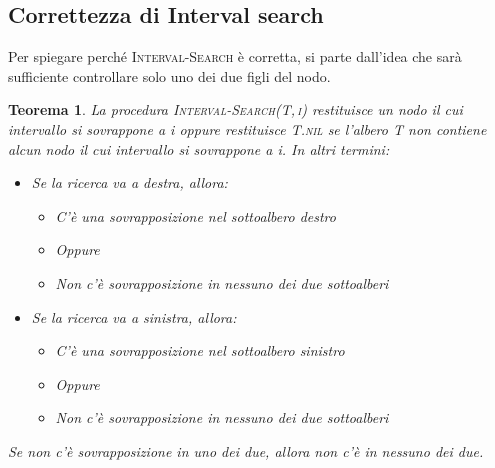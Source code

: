 \documentclass[10pt, a4paper]{report}
\newtheorem{theorem}{Teorema}[chapter]
\begin{document}
\subsection{Correttezza di Interval search}
Per spiegare perché \textsc{Interval-Search} è corretta, si parte dall'idea che sarà sufficiente controllare solo uno dei due figli del nodo.
\begin{theorem}
La procedura \textsc{Interval-Search(\textit{T,\,\textit{i}})} restituisce un nodo il cui intervallo si sovrappone a \textit{i} oppure restituisce \textit{T.\textsc{nil}} se l'albero \textit{T} non contiene alcun nodo il cui intervallo si sovrappone a \textit{i}.
In altri termini:
\begin{itemize}
\item Se la ricerca va a destra, allora:
\begin{itemize}
\item C'è una sovrapposizione nel sottoalbero destro
\item[]Oppure
\item Non c'è sovrapposizione in nessuno dei due sottoalberi
\end{itemize}
\item Se la ricerca va a sinistra, allora:
\begin{itemize}
\item C'è una sovrapposizione nel sottoalbero sinistro
\item[]Oppure
\item Non c'è sovrapposizione in nessuno dei due sottoalberi
\end{itemize}
\end{itemize}
Se non c'è sovrapposizione in uno dei due, allora non c'è in nessuno dei due.
\end{theorem}
\end{document}
